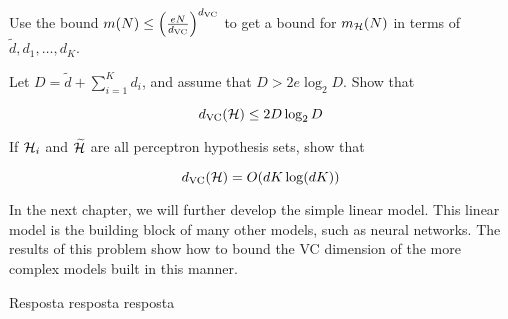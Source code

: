 \begin{enunciado}{19}
     Use the bound $m(N) \le \left( \frac{eN}{d_{\text{VC}}} \right)^{d_{\text{VC}}}$ to get a bound for $m_{\mathcal{H}}(N)$ in terms of $\tilde d, d_1, \dots, d_K$.
    
     Let $D = \tilde d + \sum\limits_{i=1}^K d_i$, and assume that $D > 2 e \log_2 D$. Show that 
    
    $$ d_{\text{VC}}(\mathcal{H}) \le 2 D \log_2 D $$
    
     If $\mathcal{H}_i$ and $\widetilde {\mathcal{H}}$ are all perceptron hypothesis sets, show that
    
    $$ d_{\text{VC}}(\mathcal{H}) = O(d K \log(dK)) $$
    
    In the next chapter, we will further develop the simple linear model. This linear model is the building block of many other models, such as neural networks. The results of this problem show how to bound the VC dimension of the more complex models built in this manner.
\end{enunciado}

Resposta resposta resposta